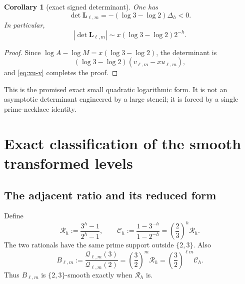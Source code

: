 \documentclass[11pt]{article}
\numberwithin{equation}{section}
\newtheorem{corollary}[theorem]{Corollary}
\theoremstyle{definition}
\theoremstyle{remark}
\begin{document}
\begin{corollary}[exact signed determinant]\label{cor:det}
One has
\begin{equation}\label{eq:detexact}
  \det\mathbf L_{\ell,m}
  =-(\log3-\log2)\Delta_h<0.
\end{equation}
In particular,
\begin{equation}\label{eq:detasymp}
  |\det\mathbf L_{\ell,m}|
  \sim x(\log3-\log2)2^{-h}.
\end{equation}
\end{corollary}

\begin{proof}
Since $\log A-\log M=x(\log3-\log2)$, the determinant is
\[
  (\log3-\log2)(v_{\ell,m}-xu_{\ell,m}),
\]
and \eqref{eq:xu-v} completes the proof.
\end{proof}

This is the promised exact small quadratic logarithmic form.  It is not an asymptotic determinant engineered by a large stencil; it is forced by a single prime-necklace identity.

\section{Exact classification of the smooth transformed levels}

\subsection{The adjacent ratio and its reduced form}

Define
\begin{equation}\label{eq:Rhdef}
  \mathcal R_h:=\frac{3^h-1}{2^h-1},
  \qquad
  \mathcal C_h:=\frac{1-3^{-h}}{1-2^{-h}}
  =\left(\frac23\right)^h\mathcal R_h.
\end{equation}
The two rationals have the same prime support outside $\{2,3\}$.  Also
\begin{equation}\label{eq:Bdef}
  B_{\ell,m}
  :=\frac{\mathcal Q_{\ell,m}(3)}{\mathcal Q_{\ell,m}(2)}
  =\left(\frac32\right)^m\mathcal R_h
  =\left(\frac32\right)^{\ell m}\mathcal C_h.
\end{equation}
Thus $B_{\ell,m}$ is $\{2,3\}$-smooth exactly when $\mathcal R_h$ is.
\end{document}
